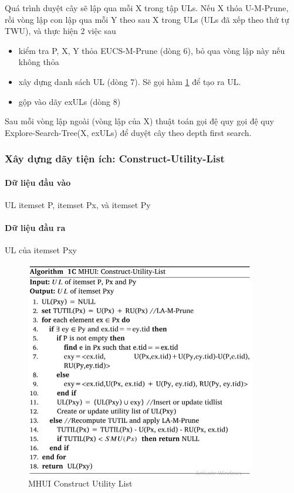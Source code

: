 Quá trình duyệt cây sẽ lập qua mỗi X trong tập ULs. Nếu X thóa U-M-Prune, rồi vòng lập con lập qua mỗi Y theo sau X trong ULs (ULs đã xếp theo thứ tự TWU), và thực hiện 2 việc sau 

\begin{itemize}
  \item kiểm tra P, X, Y thỏa EUCS-M-Prune (dòng 6), bỏ qua vòng lập này nếu không thỏa   
  \item xây dựng danh sách UL (dòng 7). Sẽ gọi hàm \ref{fig:algo3} để tạo ra UL. 
  \item gộp vào dãy exULs (dòng 8) 
\end{itemize}
 
Sau mỗi vòng lập ngoài (vòng lập của X) thuật toán gọi đệ quy gọi đệ quy Explore-Search-Tree(X, exULs) để duyệt cây theo depth first search. 

\subsubsection{Xây dựng dãy tiện ích: Construct-Utility-List }

\paragraph{Dữ liệu đầu vào} UL itemset P, itemset Px, và itemset Py 

\paragraph{Dữ liệu đầu ra} UL của itemset Pxy \\

\begin{figure}[ht]
\centering
\includegraphics[width=0.9\textwidth]{image/algo/algo3.PNG}
\caption{\label{fig:algo3} MHUI Construct Utility List}
\end{figure}

